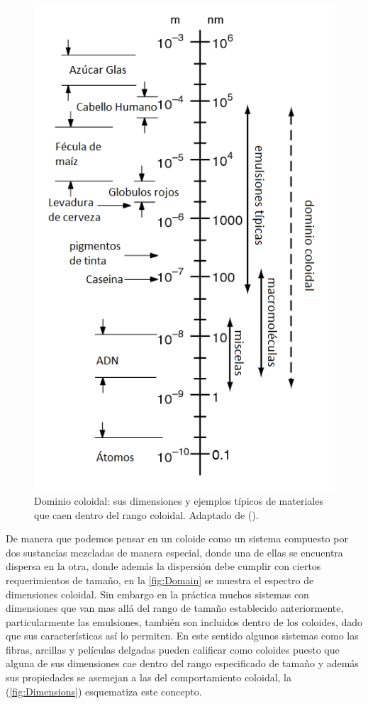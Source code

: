 \begin{figure}
\centering
\includegraphics[width=\textwidth]{Graphics/Espectro.png}
\caption[Dominio coloidal]{Dominio coloidal: sus dimensiones y ejemplos típicos de materiales que caen dentro del rango coloidal. Adaptado de (\cite{Cosgrove}). }
\label{fig:Domain}
\end{figure}

De manera que podemos pensar en un coloide como un sistema compuesto por dos sustancias mezcladas de manera especial, donde una de ellas se encuentra dispersa en la otra, donde además la dispersión debe cumplir con ciertos requerimientos de tamaño, en la \autoref{fig:Domain} se muestra el espectro de dimensiones coloidal. Sin embargo en la práctica muchos sistemas con dimensiones que van mas allá del rango de tamaño establecido anteriormente, particularmente las emulsiones, también son incluidos dentro de los coloides, dado que sus características así lo permiten. En este sentido algunos sistemas como las fibras, arcillas y películas delgadas pueden calificar como coloides puesto que alguna de sus dimensiones cae dentro del rango especificado de tamaño y además sus propiedades se asemejan a las del comportamiento coloidal, la (\autoref{fig:Dimensions}) esquematiza este concepto.

